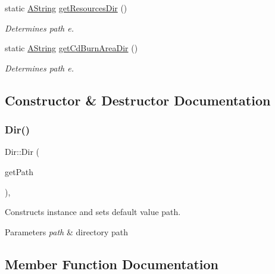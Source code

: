 \begin{DoxyCompactItemize}
static \mbox{\hyperlink{class_a_string}{A\+String}} \mbox{\hyperlink{class_dir_afe62412853426883149a3040980d6edd}{get\+Resources\+Dir}} ()
\begin{DoxyCompactList}\small\item\em Determines path e. \end{DoxyCompactList}\item 
static \mbox{\hyperlink{class_a_string}{A\+String}} \mbox{\hyperlink{class_dir_a5cf0fb165e56c039c4197851fee0e370}{get\+Cd\+Burn\+Area\+Dir}} ()
\begin{DoxyCompactList}\small\item\em Determines path e. \end{DoxyCompactList}\end{DoxyCompactItemize}


\subsection{Constructor \& Destructor Documentation}
\mbox{\label{class_dir_a1ed21a07355d3492c201d3a212aae637}} 
\subsubsection{\texorpdfstring{Dir()}{Dir()}}
{\footnotesize\ttfamily Dir\+::\+Dir (\begin{DoxyParamCaption}\item[{const \mbox{\hyperlink{class_a_string}{A\+String}} \&}]{get\+Path }\end{DoxyParamCaption})\hspace{0.3cm}{\ttfamily [explicit]}, {\ttfamily [noexcept]}}



Constructs instance and sets default value path. 


\begin{DoxyParams}{Parameters}
{\em path} & directory path \\
\hline
\end{DoxyParams}


\subsection{Member Function Documentation}
\mbox{\label{class_dir_a58485e06d15995822a108246d2b76b47}} 
